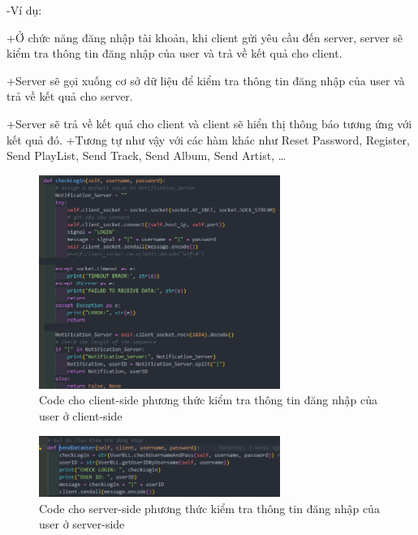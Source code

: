 \documentclass[a4paper]{article}
\begin{document}
\clearpage
\newpage
\begin{flushleft}
	-Ví dụ:

	+Ở chức năng đăng nhập tài khoản, khi client gửi yêu cầu đến server, server sẽ kiểm tra thông tin đăng nhập của user và trả về kết quả cho client.

	+Server sẽ gọi xuống cơ sở dữ liệu để kiểm tra thông tin đăng nhập của user và trả về kết quả cho server.

	+Server sẽ trả về kết quả cho client và client sẽ hiển thị thông báo tương ứng với kết quả đó.
	+Tương tự như vậy với các hàm khác như Reset Password, Register, Send PlayList, Send Track, Send Album, Send Artist, \dots
	\begin{figure}
		\centering
		\includegraphics[width=0.7\textwidth]{images/checkLogin-Client.png}
		\caption{Code cho client-side phương thức kiểm tra thông tin đăng nhập của user ở client-side}
	\end{figure}
	\begin{figure}
		\centering
		\includegraphics[width=0.7\textwidth]{images/sendDataUser-Server.png}
		\caption{Code cho server-side phương thức kiểm tra thông tin đăng nhập của user ở server-side}
	\end{figure}
\end{flushleft}
\clearpage
\newpage
\end{document}
